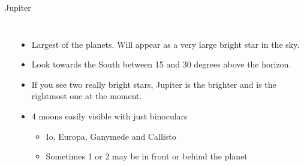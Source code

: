\documentclass[pdf, aspectratio=169]{beamer}
\begin{document}
\begin{frame}{Jupiter}
	\begin{columns}
		\begin{center}
		\end{center}
		
		\begin{itemize}
			\item Largest of the planets. Will appear as a very large bright star in the sky.
			\item Look towards the South between 15 and 30 degrees above the horizon.
			\item If you see two really bright stars, Jupiter is the brighter and is the rightmost one at the moment.
			\item 4 moons easily visible with just binoculars
				\begin{itemize}
					\item Io, Europa, Ganymede and Callisto
					\item Sometimes 1 or 2 may be in front or behind the planet
				\end{itemize}
		\end{itemize}
	\end{columns}
\end{frame}
\end{document}
